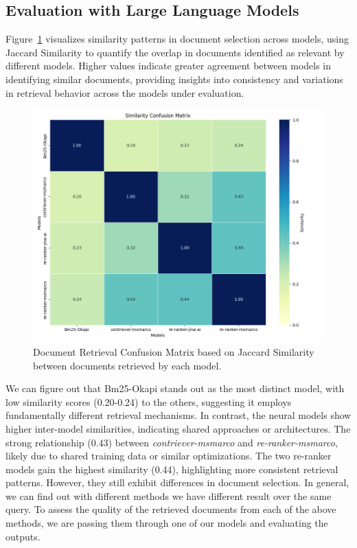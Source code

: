\subsection{Evaluation with Large Language Models}\label{subsec:evaluation-with-large-language-models}
Figure~\ref{fig:document_retrieval_confusion_matrix} visualizes similarity patterns in document selection across models, using Jaccard Similarity to quantify the overlap in documents identified as relevant by different models.
Higher values indicate greater agreement between models in identifying similar documents, providing insights into consistency and variations in retrieval behavior across the models under evaluation.
\begin{figure}[ht!]
    \centering
    \begin{minipage}[b]{0.45\textwidth}
        \centering
        \includegraphics[width=\textwidth]{res/ret_result_sim_1}
    \end{minipage}
    \caption{Document Retrieval Confusion Matrix based on Jaccard Similarity between documents retrieved by each model.}
    \label{fig:document_retrieval_confusion_matrix}
\end{figure}
We can figure out that Bm25-Okapi stands out as the most distinct model, with low similarity scores (0.20-0.24) to the others, suggesting it employs fundamentally different retrieval mechanisms.
In contrast, the neural models show higher inter-model similarities, indicating shared approaches or architectures.
The strong relationship (0.43) between \textit{contriever-msmarco} and \textit{re-ranker-msmarco}, likely due to shared training data or similar optimizations.
The two re-ranker models gain the highest similarity (0.44), highlighting more consistent retrieval patterns.
However, they still exhibit differences in document selection.
In general, we can find out with different methods we have different result over the same query.
To assess the quality of the retrieved documents from each of the above methods, we are passing them through one of our models and evaluating the outputs.

